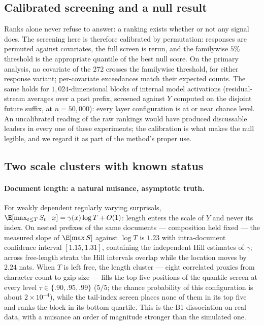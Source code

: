 \subsection{Calibrated screening and a null result}

Ranks alone never refuse to answer: a ranking exists whether or not any
signal does. The screening here is therefore calibrated by permutation:
responses are permuted against covariates, the full screen is rerun, and
the familywise $5\%$ threshold is the appropriate quantile of the
best null score. On the primary analysis, no covariate of the $272$
crosses the familywise threshold, for either response variant; per-covariate
exceedances match their expected counts. The same holds for
$1{,}024$-dimensional blocks of internal model activations (residual-stream
averages over a past prefix, screened against $Y$ computed on the
disjoint future suffix, at $n=50{,}000$): every layer configuration is
at or near chance level. An uncalibrated reading of the raw rankings
would have produced discussable leaders in every one of these
experiments; the calibration is what makes the null legible, and we
regard it as part of the method's proper use.

\subsection{Two scale clusters with known status}

\paragraph{Document length: a natural nuisance, asymptotic truth.}
For weakly dependent regularly varying surprisals,
$\E[\max_{t\le T}S_t\mid x]=\gamma(x)\log T+O(1)$: length enters the
scale of $Y$ and never its index. On nested prefixes of the same
documents --- composition held fixed --- the measured slope of
$\E[\max S]$ against $\log T$ is $1.23$ with intra-document confidence
interval $[1.15,1.31]$, containing the independent Hill estimates of
$\gamma$; across free-length strata the Hill intervals overlap while
the location moves by $2.24$ nats. When $T$ is left free, the length
cluster --- eight correlated proxies from character count to gzip
size --- fills the top five positions of the quantile screen at every
level $\tau\in\{.90,.95,.99\}$ ($5/5$; the chance probability of this
configuration is about $2\times10^{-4}$), while the tail-index screen
places none of them in its top five and ranks the block in its bottom
quartile. This is the B1 dissociation on real data, with a nuisance an
order of magnitude stronger than the simulated one.

